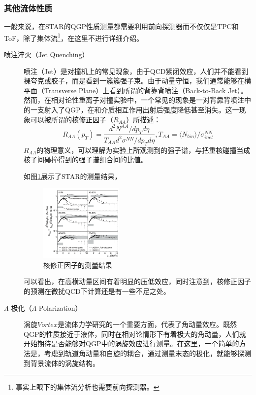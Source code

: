 \documentclass[%
 reprint,
 amsmath,amssymb,
 aps,
]{revtex4-1}
\begin{document}
\subsubsection{其他流体性质}
一般来说，在STAR的QGP性质测量都需要利用前向探测器而不仅仅是TPC和ToF，除了集体流\footnote{事实上眼下的集体流分析也需要前向探测器。}，在这里不进行详细介绍。
\begin{description}
    \item[喷注淬火（Jet Quenching）] 喷注（Jet）是对撞机上的常见现象，由于QCD紧闭效应，人们并不能看到裸夸克或胶子，而是看到一簇簇强子束。由于动量守恒，我们通常能够在横平面（Transverse Plane）上看到所谓的背靠背喷注（Back-to-Back Jet）。然而，在相对论性重离子对撞实验中，一个常见的现象是一对背靠背喷注中的一支射入了QGP，在和介质相互作用出射后强度降低甚至消失。这一现象可以被所谓的核修正因子（$R_{AA}$）所描述：
    \begin{equation}
        R_{AA}(p_T) = \frac{d^2 N^{AA}/dp_Td\eta}{T_{AA}d^2 \sigma^{NN}/dp_Td\eta},T_{AA} = \langle N_{bin} \rangle/\sigma^{NN}_{inel}
    \end{equation} 
    $R_{AA}$的物理意义，可以理解为实验上所观测到的强子谱，与把重核碰撞当成核子间碰撞得到的强子谱组合间的比值。

    如图\ref{fig:RAA}展示了STAR的测量结果\cite{Adams:2003kv}，
    \begin{figure}[htbp]
        \includegraphics[width=0.4\textwidth]{Plots/RAA.png}
        \caption{\label{fig:RAA}核修正因子的测量结果}
    \end{figure}
    可以看出，在高横动量区间有着明显的压低效应，同时注意到，核修正因子的预测在微扰QCD下计算还是有一些不足之处。
    \item[$\Lambda$ 极化（$\Lambda$ Polarization）] 涡旋$Vortex$是流体力学研究的一个重要方面，代表了角动量效应。既然QGP的性质接近于液体，同时在相对论情形下有着极大的角动量，人们就开始期待是否能够对QGP中的涡旋效应进行测量。在这里，一个简单的方法是，考虑到轨道角动量和自旋的耦合，通过测量末态的极化，就能够探测到背景流体的涡旋结构。
    

\end{description}
\end{document}
